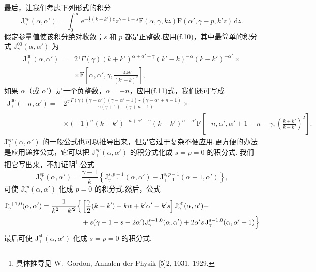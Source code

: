 最后，让我们考虑下列形式的积分
\begin{equation}
  \mathrm{J}_{\gamma}^{sp}(\alpha,\alpha')=\int_0^{\infty}
  \mathrm{e}^{-\frac{1}{2}(k+k')z}z^{\gamma-1+s}
  \mathrm{F}(\alpha,\gamma,kz)\mathrm{F}(\alpha',\gamma-p,k'z)\,\mathrm{d}z.
\end{equation}
假定参量值使该积分绝对收敛；$s$ 和 $p$ 都是正整数.应用(f.10)，其中最简单的积分式 $\mathrm{J}_{\gamma}^{00}(\alpha,\alpha')$ 为
\begin{equation}
\begin{aligned}
  \mathrm{J}_{\gamma}^{00}(\alpha,\alpha')={}&2^{\gamma}\Gamma(\gamma)
  (k+k')^{\alpha+\alpha'-\gamma}(k'-k)^{-\alpha}(k-k')^{-\alpha'}\times\\
  &\times\mathrm{F}\left[\alpha,\alpha',\gamma,\frac{-4kk'}{(k'-k)^2}\right],
\end{aligned}
\end{equation}
如果 $\alpha$（或 $\alpha'$）是一个负整数，$\alpha=-n$，应用(f.11)式，我们还可写成
\begin{equation}
\begin{aligned}
  \mathrm{J}_{\gamma}^{00}(-n,\alpha')={}&2^{\gamma}
  \frac{\Gamma(\gamma)(\gamma-\alpha')(\gamma-\alpha'+1)\cdots(\gamma-\alpha'+n-1)}
  {\gamma(\gamma+1)\cdots(\gamma+n-1)}\times\\
  &\times(-1)^n(k+k')^{-n+\alpha'-\gamma}(k-k')^{n-\alpha'}
  \mathrm{F}\left[-n,\alpha',\alpha'+1-n-\gamma,
  \left(\frac{k+k'}{k-k'}\right)^2\right].
\end{aligned}
\end{equation}
$\mathrm{J}_{\gamma}^{sp}(\alpha,\alpha')$ 的一般公式也可以推导出来，但是它过于复杂不便应用.更方便的办法是应用递推公式，它可以把 $\mathrm{J}_{\gamma}^{sp}(\alpha,\alpha')$ 的积分式化成 $s=p=0$ 的积分式. 我们把它写出来，不加证明\footnote{具体推导见 W.~Gordon, Annalen der Physik [5]2, 1031, 1929.}.公式
\begin{equation}
  \mathrm{J}_{\gamma}^{sp}(\alpha,\alpha')=\frac{\gamma-1}{k}
  \left\{\mathrm{J}_{\gamma-1}^{s,p-1}(\alpha,\alpha')
  -\mathrm{J}_{\gamma-1}^{s,p-1}(\alpha-1,\alpha')\right\},
\end{equation}
可使 $\mathrm{J}_{\gamma}^{sp}(\alpha,\alpha')$ 化成 $p=0$ 的积分式.然后，公式
\begin{equation}
\begin{aligned}
  \mathrm{J}_{\gamma}^{s+1,0}(\alpha,\alpha')=\frac{1}{k^2-k'^2}\Bigl\{
  &\left[\frac{\gamma}{2}(k-k')-k\alpha+k'\alpha'-k's\right]
  \mathrm{J}_{\gamma}^{s0}(\alpha,\alpha')+\\
  &+s(\gamma-1+s-2\alpha')\mathrm{J}_{\gamma}^{s-1,0}(\alpha,\alpha')
  +2\alpha's\,\mathrm{J}_{\gamma}^{s-1,0}(\alpha,\alpha'+1)\Bigr\}
\end{aligned}
\end{equation}
最后可使 $\mathrm{J}_{\gamma}^{s0}(\alpha,\alpha')$ 化成 $s=p=0$ 的积分式.

\renewcommand{\thesection}{\arabic{section}}
\renewcommand{\theequation}{\arabic{section}.\arabic{equation}}
